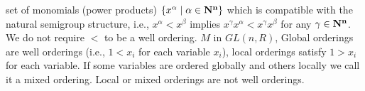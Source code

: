 set of monomials (power products) $\{x^\alpha \mid \alpha \in \bf{N}^n\}$
which is compatible with the
natural semigroup structure, i.e., $x^\alpha < x^\beta$ implies $x^\gamma
x^\alpha < x^\gamma x^\beta$ for any $\gamma \in \bf{N}^n$.
We do not require
$<$ to be  a well ordering.
$M$ in $GL(n,R)$,
Global orderings are well orderings (i.e.,  \hbox{$1 < x_i$} for each variable
$x_i$), local orderings satisfy $1 > x_i$ for each variable.   If some variables are ordered globally and others locally we
call it a mixed ordering.   Local or mixed orderings are not well orderings.

